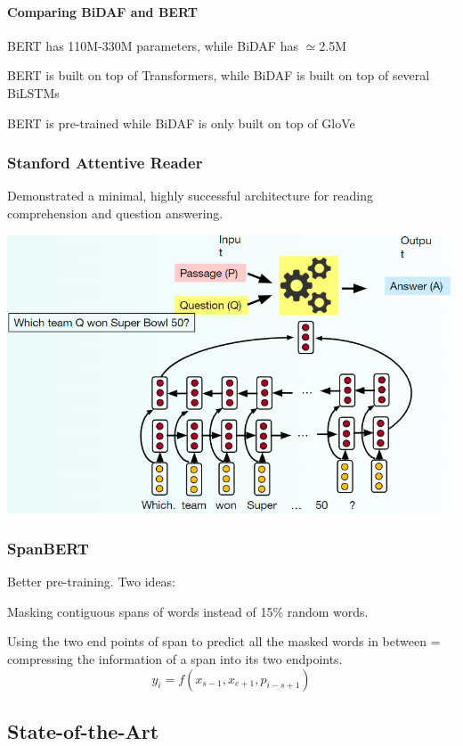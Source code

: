 \documentclass[10pt]{report}
\begin{document}
\paragraph{Comparing BiDAF and BERT}
\begin{list}{}{}
	\item BERT has 110M-330M parameters, while BiDAF has $\simeq$2.5M
	\item BERT is built on top of Transformers, while BiDAF is built on top of several BiLSTMs
	\item BERT is pre-trained while BiDAF is only built on top of GloVe
\end{list}
\subsubsection{Stanford Attentive Reader} Demonstrated a minimal, highly successful architecture for reading comprehension and question answering.
\begin{center}
	\includegraphics[scale=0.5]{128.png}
\end{center}

\subsubsection{SpanBERT} Better pre-training. Two ideas:
\begin{list}{}{}
	\item Masking contiguous spans of words instead of 15\% random words.
	\item Using the two end points of span to predict all the masked words in between = compressing the information of a span into its two endpoints.
	$$y_i = f(x_{s-1}, x_{e+1}, p_{i-s+1})$$
\end{list}
\subsection{State-of-the-Art}
\end{document}
